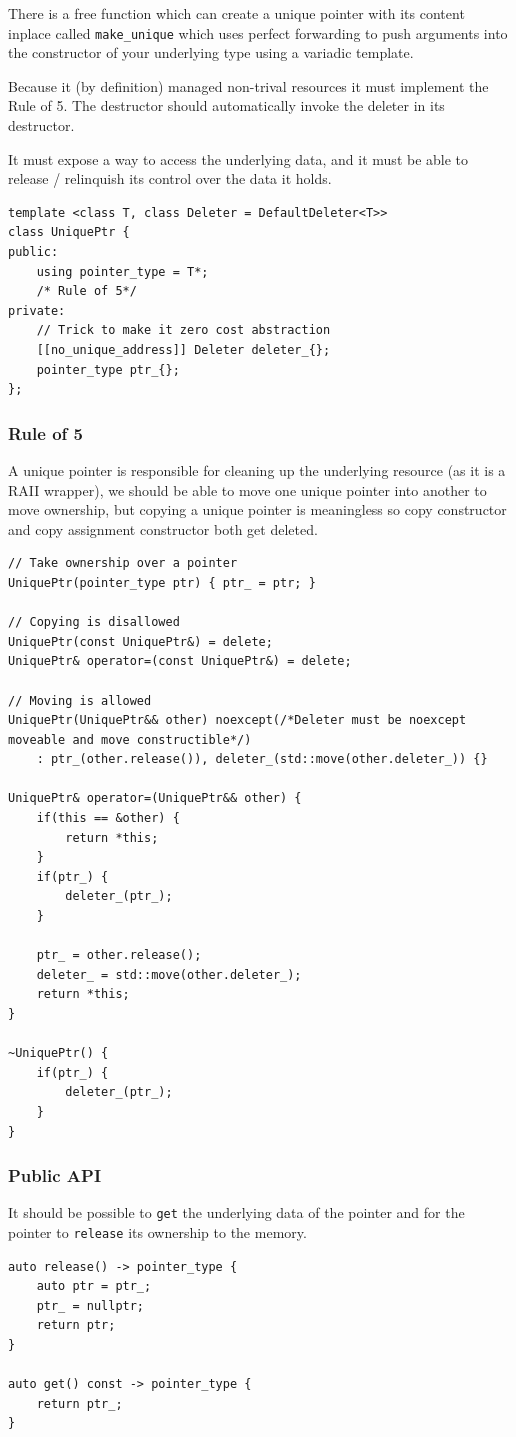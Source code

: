 \documentclass{article}
\begin{document}
There is a free function which can create a unique pointer with its content inplace called \texttt{make\_unique} which uses perfect forwarding to push arguments into the constructor of your underlying type using a variadic template.

Because it (by definition) managed non-trival resources it must implement the Rule of 5. The destructor should automatically invoke the deleter in its destructor.

It must expose a way to access the underlying data, and it must be able to release / relinquish its control over the data it holds.

\begin{lstlisting}
template <class T, class Deleter = DefaultDeleter<T>>
class UniquePtr {
public:
    using pointer_type = T*;
    /* Rule of 5*/
private:
    // Trick to make it zero cost abstraction
    [[no_unique_address]] Deleter deleter_{}; 
    pointer_type ptr_{}; 
};
\end{lstlisting}

\subsubsection{Rule of 5}
A unique pointer is responsible for cleaning up the underlying resource (as it is a RAII wrapper), we should be able to move one unique pointer into another to move ownership, but copying a unique pointer is meaningless so copy constructor and copy assignment constructor both get deleted.
\begin{lstlisting}
// Take ownership over a pointer
UniquePtr(pointer_type ptr) { ptr_ = ptr; }

// Copying is disallowed
UniquePtr(const UniquePtr&) = delete;
UniquePtr& operator=(const UniquePtr&) = delete;

// Moving is allowed
UniquePtr(UniquePtr&& other) noexcept(/*Deleter must be noexcept moveable and move constructible*/)
    : ptr_(other.release()), deleter_(std::move(other.deleter_)) {}
    
UniquePtr& operator=(UniquePtr&& other) {
    if(this == &other) {
        return *this;
    }
    if(ptr_) {
        deleter_(ptr_);
    }

    ptr_ = other.release();
    deleter_ = std::move(other.deleter_);
    return *this;
}

~UniquePtr() {
    if(ptr_) {
        deleter_(ptr_);
    }
}
\end{lstlisting}

\subsubsection{Public API}
It should be possible to \texttt{get} the underlying data of the pointer and for the pointer to \texttt{release} its ownership to the memory.
\begin{lstlisting}
auto release() -> pointer_type {
    auto ptr = ptr_;
    ptr_ = nullptr;
    return ptr;
}

auto get() const -> pointer_type {
    return ptr_;
}
\end{lstlisting}
\end{document}
